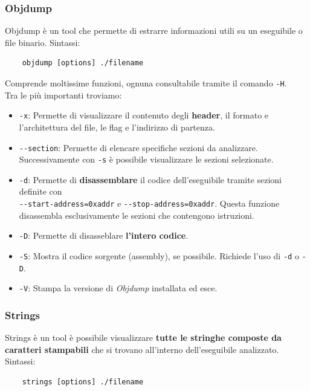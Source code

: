 \documentclass{article}
\begin{document}
\subsubsection{Objdump}
Objdump è un tool che permette di estrarre informazioni utili su un
eseguibile o file binario. Sintassi:
\begin{verbatim}
	objdump [options] ./filename
\end{verbatim}

Comprende moltissime funzioni, ognuna consultabile tramite il comando \verb|-H|.\\
Tra le più importanti troviamo:
\begin{itemize}
	\item \verb|-x|: Permette di visualizzare il contenuto degli \textbf{header}, il formato e l'architettura del file, le flag e l'indirizzo di partenza.
	
	\item \verb|--section|: Permette di elencare specifiche sezioni da analizzare. Successivamente con \verb|-s| è possibile visualizzare le sezioni selezionate.
	
	\item \verb|-d|: Permette di \textbf{disassemblare} il codice dell'eseguibile tramite sezioni definite con\\ \verb|--start-address=0xaddr| e \verb|--stop-address=0xaddr|. Questa funzione disassembla esclusivamente le sezioni che contengono istruzioni.
	
	\item \verb|-D|: Permette di disasseblare \textbf{l'intero codice}.
	
	\item \verb|-S|: Mostra il codice sorgente (assembly), se possibile. Richiede l'uso di \verb|-d| o \verb|-D|.
	
	\item \verb|-V|: Stampa la versione di \textit{Objdump} installata ed esce.
\end{itemize}

\subsubsection{Strings}
Strings è un tool è possibile visualizzare \textbf{tutte le stringhe composte da caratteri stampabili} che si trovano all’interno dell’eseguibile analizzato. Sintassi:
\begin{verbatim}
	strings [options] ./filename
\end{verbatim}
\end{document}
